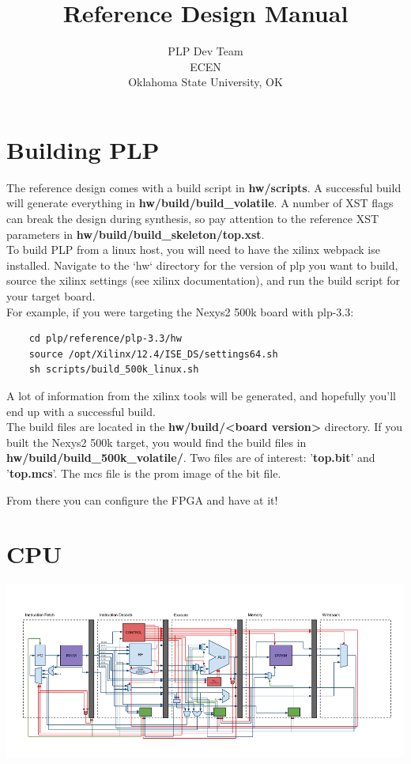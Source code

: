 \documentclass{article}
\begin{document}
\title{Reference Design Manual}
\author{PLP Dev Team\\
        ECEN \\
        Oklahoma State University, OK}
        
\maketitle

\section{Building PLP}
	The reference design comes with a build script in \textbf{hw/scripts}. A successful build will generate everything in \textbf{hw/build/build\_volatile}.
	A number of XST flags can break the design during synthesis, so pay attention to the reference XST parameters in \textbf{hw/build/build\_skeleton/top.xst}.\\


To build PLP from a linux host, you will need to have the xilinx webpack ise installed. Navigate to the `hw` directory for the version of plp you want to build, source the xilinx settings (see xilinx documentation), and run the build script for your target board.\\ 

For example, if you were targeting the Nexys2 500k board with plp-3.3:

\begin{verbatim}
    cd plp/reference/plp-3.3/hw
    source /opt/Xilinx/12.4/ISE_DS/settings64.sh
    sh scripts/build_500k_linux.sh
\end{verbatim}
A lot of information from the xilinx tools will be generated, and hopefully you'll end up with a successful build.\\

The build files are located in the \textbf{hw/build/\textless board version\textgreater} directory. If you built the Nexys2 500k target, you would find the build files in \textbf{hw/build/build\_500k\_volatile/}.
Two files are of interest: '\textbf{top.bit}' and '\textbf{top.mcs}'. The mcs file is the prom image of the bit file.

From there you can configure the FPGA and have at it!
\pagebreak
\section{CPU}
\includegraphics[scale=0.6]{CPUDiagram.png}
\end{document}
